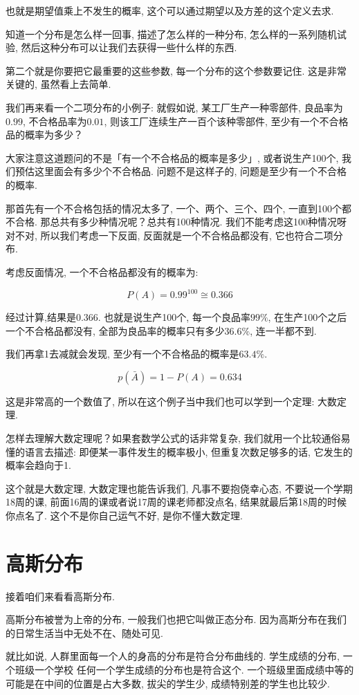 也就是期望值乘上不发生的概率, 这个可以通过期望以及方差的这个定义去求. 

知道一个分布是怎么样一回事, 描述了怎么样的一种分布, 怎么样的一系列随机试验, 然后这种分布可以让我们去获得一些什么样的东西. 

第二个就是你要把它最重要的这些参数, 每一个分布的这个参数要记住. 这是非常关键的, 虽然看上去简单. 

我们再来看一个二项分布的小例子: 就假如说, 某工厂生产一种零部件, 良品率为$0.99$, 不合格品率为$0.01$,  则该工厂连续生产一百个该种零部件, 至少有一个不合格品的概率为多少？

大家注意这道题问的不是「有一个不合格品的概率是多少」, 或者说生产100个, 我们预估这里面会有多少个不合格品. 问题不是这样子的, 问题是至少有一个不合格的概率. 

那首先有一个不合格包括的情况太多了, 一个、两个、三个、四个, 一直到100个都不合格. 那总共有多少种情况呢？总共有100种情况. 我们不能考虑这100种情况呀对不对, 所以我们考虑一下反面, 反面就是一个不合格品都没有, 它也符合二项分布. 

考虑反面情况, 一个不合格品都没有的概率为: 

\[P(A) = 0.99^100 \cong 0.366\]

经过计算,结果是$0.366$. 也就是说生产100个, 每一个良品率$99\%$, 在生产100个之后一个不合格品都没有, 全部为良品率的概率只有多少$36.6\%$, 连一半都不到. 

我们再拿1去减就会发现, 至少有一个不合格品的概率是$63.4\%$. 

\[p(\bar A) = 1-P(A) = 0.634\]

这是非常高的一个数值了, 所以在这个例子当中我们也可以学到一个定理: 大数定理. 

怎样去理解大数定理呢？如果套数学公式的话非常复杂, 我们就用一个比较通俗易懂的语言去描述: 即便某一事件发生的概率极小, 但重复次数足够多的话,  它发生的概率会趋向于1. 

这个就是大数定理, 大数定理也能告诉我们, 凡事不要抱侥幸心态, 不要说一个学期18周的课, 前面16周的课或者说17周的课老师都没点名, 结果就最后第18周的时候你点名了. 这个不是你自己运气不好, 是你不懂大数定理. 

\section{高斯分布}

接着咱们来看看高斯分布. 

高斯分布被誉为上帝的分布, 一般我们也把它叫做正态分布. 因为高斯分布在我们的日常生活当中无处不在、随处可见. 

就比如说, 人群里面每一个人的身高的分布是符合分布曲线的. 学生成绩的分布, 一个班级一个学校
任何一个学生成绩的分布也是符合这个. 一个班级里面成绩中等的可能是在中间的位置是占大多数, 拔尖的学生少, 成绩特别差的学生也比较少. 

